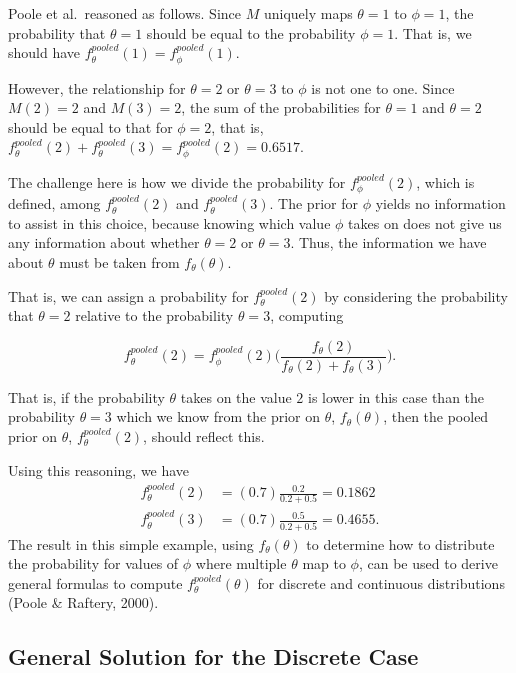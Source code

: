 \documentclass[12pt,twoside]{smiththesis}
\begin{document}
Poole et al.~reasoned as follows. Since \(M\) uniquely maps \(\theta=1\) to \(\phi =1\), the probability that \(\theta=1\) should be equal to the probability \(\phi = 1\). That is, we should have \(f_\theta^{pooled}(1) = f_\phi^{pooled}(1)\).

However, the relationship for \(\theta=2\) or \(\theta=3\) to \(\phi\) is not one to one. Since \(M(2)=2\) and \(M(3)=2\), the sum of the probabilities for \(\theta=1\) and \(\theta=2\) should be equal to that for \(\phi=2\), that is, \(f_\theta^{pooled}(2) + f_\theta^{pooled}(3) = f_\phi^{pooled}(2) = 0.6517\).

The challenge here is how we divide the probability for \(f_\phi^{pooled}(2)\), which is defined, among \(f_\theta^{pooled}(2)\) and \(f_\theta^{pooled}(3)\). The prior for \(\phi\) yields no information to assist in this choice, because knowing which value \(\phi\) takes on does not give us any information about whether \(\theta=2\) or \(\theta=3\). Thus, the information we have about \(\theta\) must be taken from \(f_\theta(\theta)\).

That is, we can assign a probability for \(f_\theta^{pooled}(2)\) by considering the probability that \(\theta = 2\) relative to the probability \(\theta =3\), computing

\[f_\theta^{pooled}(2) = f_\phi^{pooled}(2) \Big( \frac{f_\theta(2)}{f_\theta(2) + f_\theta(3)}\Big).\]

That is, if the probability \(\theta\) takes on the value \(2\) is lower in this case than the probability \(\theta=3\) which we know from the prior on \(\theta\), \(f_\theta(\theta)\), then the pooled prior on \(\theta\), \(f_\theta^{pooled}(2)\), should reflect this.

Using this reasoning, we have
\begin{align*} f_\theta^{pooled}(2) &= (0.7) \frac{0.2}{0.2+0.5} = 0.1862\\
f_\theta^{pooled}(3) &= (0.7) \frac{0.5}{0.2+0.5} = 0.4655.
\end{align*}
The result in this simple example, using \(f_\theta(\theta)\) to determine how to distribute the probability for values of \(\phi\) where multiple \(\theta\) map to \(\phi\), can be used to derive general formulas to compute \(f_\theta^{pooled}(\theta)\) for discrete and continuous distributions (Poole \& Raftery, 2000).

\hypertarget{general-solution-for-the-discrete-case}{%
\subsection{General Solution for the Discrete Case}\label{general-solution-for-the-discrete-case}}
\end{document}

